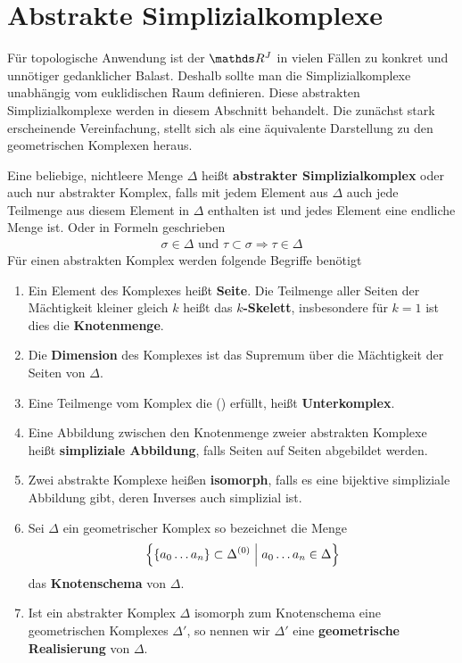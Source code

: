 
\section{Abstrakte Simplizialkomplexe}

Für topologische Anwendung ist der $\R^J$ in vielen Fällen zu konkret
und unnötiger gedanklicher Balast. Deshalb sollte man die
Simplizialkomplexe unabhängig vom euklidischen Raum definieren. Diese
abstrakten Simplizialkomplexe werden in diesem Abschnitt
behandelt. Die zunächst stark erscheinende Vereinfachung, stellt sich
als eine äquivalente Darstellung zu den geometrischen Komplexen
heraus.

\begin{Def}
  Eine beliebige, nichtleere Menge $\Delta$ heißt \textbf{abstrakter
    Simplizialkomplex} oder auch nur abstrakter Komplex, falls mit
  jedem Element aus $\Delta$ auch jede Teilmenge aus diesem Element in
  $\Delta$ enthalten ist und jedes Element eine endliche
  Menge ist. Oder in Formeln geschrieben
\renewcommand*{\theequation}{\textbullet}
  \begin{gather}
    \sigma \in \Delta \text{ und }  \tau \subset \sigma
    \Rightarrow \tau \in \Delta
  \end{gather}
  Für einen abstrakten Komplex werden folgende Begriffe benötigt
  \begin{enumerate}[({A}1)]
  \item Ein Element des Komplexes heißt \textbf{Seite}. Die Teilmenge aller
    Seiten der Mächtigkeit kleiner gleich $k$ heißt das \textbf{$k$-Skelett},
    insbesondere für $k=1$ ist dies die \textbf{Knotenmenge}.
  \item Die \textbf{Dimension} des Komplexes ist das Supremum über die
    Mächtigkeit der Seiten von $\Delta$.
  \item Eine Teilmenge vom Komplex die (\textbullet) erfüllt, heißt
    \textbf{Unterkomplex}.
  \item Eine Abbildung zwischen den Knotenmenge zweier abstrakten
    Komplexe heißt \textbf{simpliziale Abbildung}, falls Seiten auf
    Seiten abgebildet werden.
  \item Zwei abstrakte Komplexe heißen \textbf{isomorph}, falls es eine
    bijektive simpliziale Abbildung gibt, deren Inverses auch
    simplizial ist.
  \item Sei $\Delta$ ein geometrischer Komplex so bezeichnet die Menge
    \begin{gather*}
      \left\{  \left\{ a_0 \ldots a_n \right\} \subset \Delta^{(0)}  \; \Big| \;  a_0 \ldots
        a_n \in \Delta \right\}
    \end{gather*}
    das \textbf{Knotenschema} von $\Delta$.
  \item Ist ein abstrakter Komplex $\Delta$ isomorph zum Knotenschema
    eine geometrischen Komplexes $\Delta'$, so nennen wir $\Delta'$
    eine \textbf{geometrische Realisierung} von $\Delta$.
  \end{enumerate}
\end{Def}

